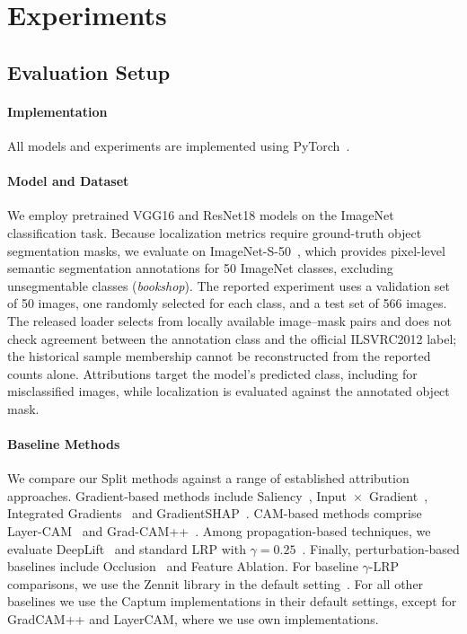 \section{Experiments}\label{sec:experiments}

\subsection{Evaluation Setup}

\paragraph{Implementation}
All models and experiments are implemented using PyTorch~\citep{Paszke2019PyTorch}.

\paragraph{Model and Dataset}
We employ pretrained VGG16 and ResNet18 models on the ImageNet \cite{Deng2009} classification task.
Because localization metrics require ground-truth object segmentation masks, we evaluate on ImageNet-S-50~\citep{Gao2022imagenets}, which provides pixel-level semantic segmentation annotations for 50 ImageNet classes, excluding unsegmentable classes (\eg \emph{bookshop}).
The reported experiment uses a validation set of 50 images, one randomly selected for each class, and a test set of 566 images. The released loader selects from locally available image--mask pairs and does not check agreement between the annotation class and the official ILSVRC2012 label; the historical sample membership cannot be reconstructed from the reported counts alone. Attributions target the model's predicted class, including for misclassified images, while localization is evaluated against the annotated object mask.

\paragraph{Baseline Methods}
We compare our Split methods against a range of established attribution approaches. Gradient-based methods include Saliency~\citep{Simonyan2014}, Input~$\times$~Gradient~\citep{Shrikumar2017}, Integrated Gradients~\citep{Sundararajan2017} and GradientSHAP~\citep{LundbergLee2017}. CAM-based methods comprise Layer-CAM~\citep{Jiang2021LayerCAM} and Grad-CAM++~\citep{Chattopadhay2018}. Among propagation-based techniques, we evaluate DeepLift~\citep{Shrikumar2017} and standard LRP with $\gamma=0.25$~\citep{Bach2015}. Finally, perturbation-based baselines include Occlusion~\citep{ZeilerFergus2014} and Feature Ablation.
For baseline $\gamma$-LRP comparisons, we use the Zennit library in the default setting~\citep{Anders2021Zennit}.
For all other baselines we use the Captum \citep{kokhlikyan2020captum} implementations in their default settings, except for GradCAM++ and LayerCAM, where we use own implementations.

